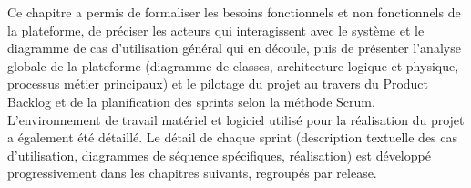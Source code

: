     Ce chapitre a permis de formaliser les besoins fonctionnels et non fonctionnels de la plateforme, de préciser les acteurs qui interagissent avec le système et le diagramme de cas d'utilisation général qui en découle, puis de présenter l'analyse globale de la plateforme (diagramme de classes, architecture logique et physique, processus métier principaux) et le pilotage du projet au travers du Product Backlog et de la planification des sprints selon la méthode Scrum. L'environnement de travail matériel et logiciel utilisé pour la réalisation du projet a également été détaillé. Le détail de chaque sprint (description textuelle des cas d'utilisation, diagrammes de séquence spécifiques, réalisation) est développé progressivement dans les chapitres suivants, regroupés par release.
    